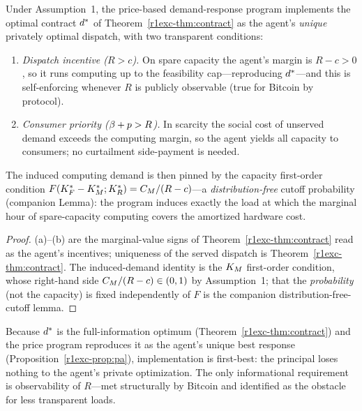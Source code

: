 \begin{proposition}\label{r1exc-prop:pa}
Under Assumption~1, the price-based demand-response program implements the optimal
contract $d^{*}$ of Theorem~\ref{r1exc-thm:contract} as the agent's \emph{unique}
privately optimal dispatch, with two transparent conditions:
\begin{enumerate}[label=(\alph*),leftmargin=2.2em]
  \item \emph{Dispatch incentive ($R>c$).} On spare capacity the agent's margin is
        $R-c>0$, so it runs computing up to the feasibility cap---reproducing
        $d^{*}$---and this is self-enforcing whenever $R$ is publicly observable
        (true for Bitcoin by protocol).
  \item \emph{Consumer priority ($\beta+p>R$).} In scarcity the social cost of unserved
        demand exceeds the computing margin, so the agent yields all capacity to
        consumers; no curtailment side-payment is needed.
\end{enumerate}
The induced computing demand is then pinned by the capacity first-order condition
$F(K_F^{*}-K_M^{*};K_R^{*})=C_M/(R-c)$---a \emph{distribution-free} cutoff probability
(companion Lemma): the program induces exactly the load at which the marginal
hour of spare-capacity computing covers the amortized hardware cost.
\end{proposition}

\begin{proof}
(a)--(b) are the marginal-value signs of Theorem~\ref{r1exc-thm:contract} read as the
agent's incentives; uniqueness of the served dispatch is
Theorem~\ref{r1exc-thm:contract}. The induced-demand identity is the $K_M$ first-order
condition, whose right-hand side $C_M/(R-c)\in(0,1)$ by Assumption~1; that the
\emph{probability} (not the capacity) is fixed independently of $F$ is the
companion distribution-free-cutoff lemma.
\end{proof}

\begin{remark}
Because $d^{*}$ is the full-information optimum (Theorem~\ref{r1exc-thm:contract}) and
the price program reproduces it as the agent's unique best response
(Proposition~\ref{r1exc-prop:pa}), implementation is first-best: the principal loses
nothing to the agent's private optimization. The only informational requirement is
observability of $R$---met structurally by Bitcoin and identified as the obstacle
for less transparent loads.
\end{remark}

